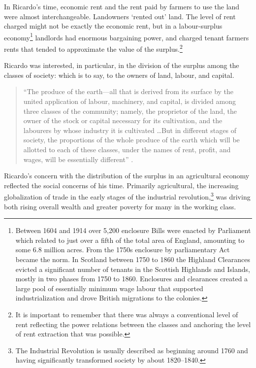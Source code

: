 In Ricardo's time, economic rent and the rent paid by farmers to use the land were almost interchangeable. Landowners `rented out' land. The level of rent charged might not be exactly the economic rent, but in a labour-surplus economy\footnote{Between 1604 and 1914 over 5,200 enclosure Bills were enacted by Parliament which related to just over a fifth of the total area of England, amounting to some 6.8 million acres. From the 1750s enclosure by parliamentary Act became the norm. In Scotland  between 1750 to 1860 the  Highland Clearances  evicted a significant number of tenants in the Scottish Highlands and Islands, mostly in two phases from 1750 to 1860. Enclosures and clearances created a large pool of essentially minimum wage labour that supported industrialization and drove British migrations to the colonies.} landlords had enormous bargaining power, and charged tenant farmers rents that tended to approximate the value of the \gls{surplus}.\footnote{It is important to remember that there was always a conventional level of rent reflecting the power relations between the classes and anchoring the level of rent extraction that was possible.} 


Ricardo was interested, in particular, in the division of the surplus among the classes of society:  which is to say, to the owners of land, labour, and capital.\begin{quotation}
 \noindent ``The produce of the earth---all that is derived from its surface by the united application of labour, machinery, and capital, is divided among three classes of the community; namely, the proprietor of the land, the owner of the stock or capital necessary for its cultivation, and the labourers by whose industry it is cultivated \dots  But in different stages of society, the proportions of the whole produce of the earth which will be allotted to each of these classes, under the names of rent, profit, and wages, will be essentially different''  \cite{ricardoEssayInfluenceLow1815}. %
\end{quotation}
Ricardo's concern with the distribution of the surplus in an agricultural economy reflected the social concerns of his time. Primarily agricultural, the increasing globalization of trade in the early stages of the industrial revolution,\footnote{The Industrial Revolution is usually described as beginning around 1760 and having significantly transformed society by about 1820--1840.} was driving both rising overall wealth and greater poverty for many in the working class.

